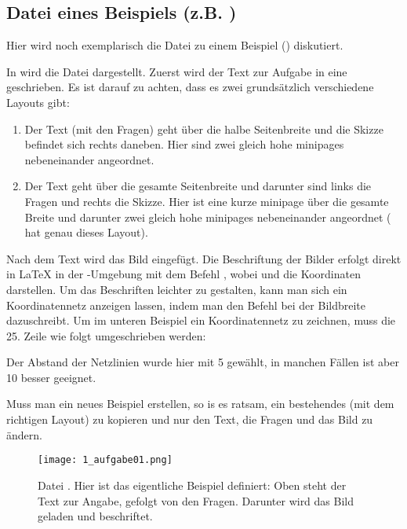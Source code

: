 \subsection{Datei eines Beispiels (z.B. ) }

Hier wird noch exemplarisch die Datei zu einem Beispiel
() diskutiert.

In  wird die Datei  dargestellt.
Zuerst wird der Text zur Aufgabe in eine 
geschrieben. Es ist darauf zu achten, dass es zwei grundsätzlich verschiedene 
Layouts gibt:

\begin {enumerate}
 \item Der Text (mit den Fragen) geht über die halbe Seitenbreite und die 
   Skizze befindet sich rechts daneben. Hier sind zwei gleich hohe minipages 
   nebeneinander angeordnet.
 \item Der Text geht über die gesamte Seitenbreite und darunter sind links die
   Fragen und rechts die Skizze. Hier ist eine kurze minipage über die gesamte
   Breite und darunter zwei gleich hohe minipages nebeneinander angeordnet
   ( hat genau dieses Layout).
\end{enumerate}

Nach dem Text wird das Bild eingefügt. Die Beschriftung der Bilder erfolgt 
direkt in \LaTeX{} in der 
-Umgebung mit dem Befehl
, wobei  und 
die Koordinaten darstellen. Um das Beschriften leichter zu gestalten, kann man
sich ein Koordinatennetz anzeigen lassen, indem man den Befehl 
 bei der Bildbreite dazuschreibt.
Um im unteren Beispiel ein Koordinatennetz zu zeichnen, muss die 25. Zeile wie
folgt umgeschrieben werden:
\begin{center}
\end{center}
Der Abstand der Netzlinien wurde hier mit 5 gewählt, in manchen Fällen ist aber
10 besser geeignet.

Muss man ein neues Beispiel erstellen, so is es ratsam, ein bestehendes (mit dem
richtigen Layout) zu kopieren und nur den Text, die Fragen und das Bild 
zu ändern.

\begin{figure}[htbp]
  \texttt{[image: 1\_aufgabe01.png]}
  \caption{Datei . Hier ist das eigentliche Beispiel
    definiert: Oben steht der Text zur Angabe, gefolgt von den Fragen. Darunter
    wird das Bild geladen und beschriftet.}
  \label{fig:aufgabe01}
\end{figure}

